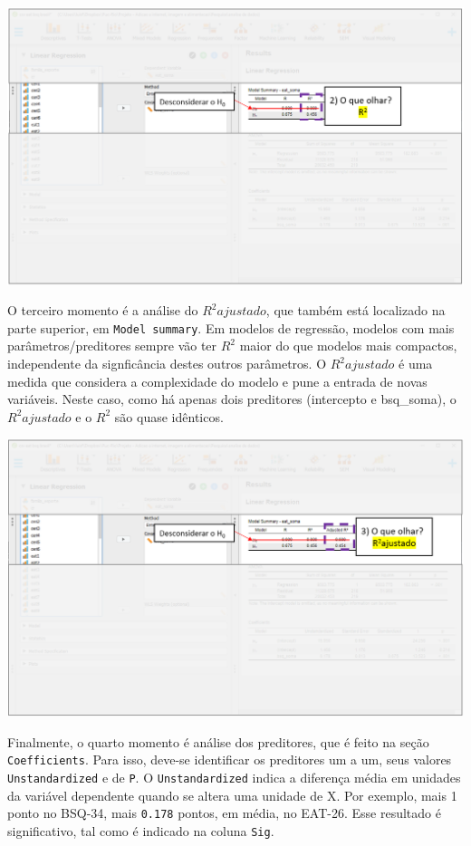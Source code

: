 \documentclass[
]{book}
\begin{document}
\includegraphics{./img/cap_reg_resultados2.png}

O terceiro momento é a análise do \(R^2 ajustado\), que também está localizado na parte superior, em \texttt{Model\ summary}. Em modelos de regressão, modelos com mais parâmetros/preditores sempre vão ter \(R^2\) maior do que modelos mais compactos, independente da signficância destes outros parâmetros. O \(R^2 ajustado\) é uma medida que considera a complexidade do modelo e pune a entrada de novas variáveis. Neste caso, como há apenas dois preditores (intercepto e bsq\_soma), o \(R^2 ajustado\) e o \(R^2\) são quase idênticos.

\includegraphics{./img/cap_reg_resultados3.png}

Finalmente, o quarto momento é análise dos preditores, que é feito na seção \texttt{Coefficients}. Para isso, deve-se identificar os preditores um a um, seus valores \texttt{Unstandardized} e de \texttt{P}. O \texttt{Unstandardized} indica a diferença média em unidades da variável dependente quando se altera uma unidade de X. Por exemplo, mais 1 ponto no BSQ-34, mais \texttt{0.178} pontos, em média, no EAT-26. Esse resultado é significativo, tal como é indicado na coluna \texttt{Sig}.
\end{document}
